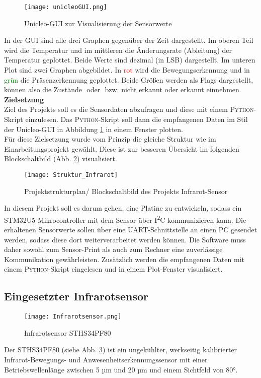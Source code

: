 \documentclass[
	letterpaper, %
	10pt, %
]{CSUniSchoolLabReport}
\begin{document}
\begin{spacing}{1.6}
\begin{figure}[H]
    \centering
    \texttt{[image: unicleoGUI.png]}
    \caption{Unicleo-GUI zur Visualisierung der Sensorwerte}
    \label{fig:Unicleo}
\end{figure}

In der GUI sind alle drei Graphen gegenüber der Zeit dargestellt. Im oberen Teil wird die Temperatur und im mittleren die Änderungsrate (Ableitung) der Temperatur geplottet. Beide Werte sind dezimal (in LSB) dargestellt. Im unteren Plot sind zwei Graphen abgebildet. In \textcolor{red}{rot} wird die Bewegungserkennung und in \textcolor{green}{grün} die Präsenzerkennung geplottet. Beide Größen werden als Flags dargestellt, können also die Zustände \grqq $ $ oder \grqq $ $ bzw. \glqq nicht erkannt\grqq $ $ oder \glqq erkannt\grqq $ $ einnehmen.\\

\textbf{Zielsetzung\\}
Ziel des Projekts soll es die Sensordaten abzufragen und diese mit einem \textsc{Python}-Skript einzulesen. Das \textsc{Python}-Skript soll dann die empfangenen Daten im Stil der Unicleo-GUI in Abbildung \ref{fig:Unicleo} in einem Fenster plotten.\\

Für diese Zielsetzung wurde vom Prinzip die gleiche Struktur wie im Einarbeitungsprojekt gewählt.
Diese ist zur besseren Übersicht im folgenden Blockschaltbild (Abb. \ref{fig:ProjektstrukturplanInfrator}) visualisiert.
\begin{figure}[H]
    \centering
    \texttt{[image: Struktur\_Infrarot]}
    \caption{Projektstrukturplan/ Blockschaltbild des Projekts \glqq Infrarot-Sensor\grqq}
    \label{fig:ProjektstrukturplanInfrator}
\end{figure}
In diesem Projekt soll es darum gehen, eine Platine zu entwickeln, sodass ein
STM32U5-Mikrocontroller mit dem Sensor über I\textsuperscript{2}C kommunizieren kann. Die erhaltenen
Sensorwerte sollen über eine UART-Schnittstelle an einen PC gesendet werden, sodass diese
dort weiterverarbeitet werden können. Die Software muss daher sowohl zum Sensor-Print als
auch zum Rechner eine zuverlässige Kommunikation gewährleisten. Zusätzlich werden die empfangenen Daten mit einem \textsc{Python}-Skript eingelesen und in einem Plot-Fenster visualisiert.\\

\subsection{Eingesetzter Infrarotsensor}
\begin{figure}[H]
    \centering
    \texttt{[image: Infrarotsensor.png]}
    \caption{Infrarotsensor STHS34PF80 \cite[1]{STHS34PF80}}
    \label{fig:Infrarot-Sensor}
\end{figure}
Der STHS34PF80 (siehe Abb. \ref{fig:Infrarot-Sensor}) ist ein ungekühlter, werkseitig kalibrierter Infrarot-Bewegungs- und Anwesenheitserkennungssensor mit einer Betriebswellenlänge zwischen 5 µm und 20 µm und einem Sichtfeld von 80°.


\end{spacing}
\end{document}
